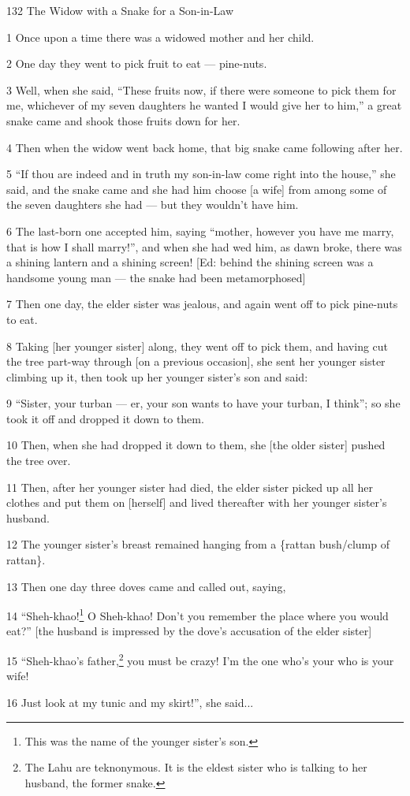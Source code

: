 
132 The Widow with a Snake for a Son-in-Law

1 Once upon a time there was a widowed mother and her child.

2 One day they went to pick fruit to eat --- pine-nuts.

3 Well, when she said, ``These fruits now, if there were someone to pick them for
me, whichever of my seven daughters he wanted I would give her to him,'' a great
snake came and shook those fruits down for her.

4 Then when the widow went back home, that big snake came following after her.

5 ``If thou are indeed and in truth my son-in-law come right into the house,''
she said, and the snake came and she had him choose [a wife] from among some of
the seven daughters she had --- but they wouldn't have him.

6 The last-born one accepted him, saying ``mother, however you have me marry, that
is how I shall marry!'', and when she had wed him, as dawn broke, there was a shining
lantern and a shining screen! [Ed: behind the shining screen was a handsome young
man --- the snake had been metamorphosed]

7 Then one day, the elder sister was jealous, and again went off to pick pine-nuts
to eat.

8 Taking [her younger sister] along, they went off to pick them, and having cut
the tree part-way through [on a previous occasion], she sent her younger sister
climbing up it, then took up her younger sister's son and said:

9 ``Sister, your turban --- er, your son wants to have your turban, I think'';
so she took it off and dropped it down to them.

10 Then, when she had dropped it down to them, she [the older sister] pushed the
tree over.

11 Then, after her younger sister had died, the elder sister picked up all her
clothes and put them on [herself] and lived thereafter with her younger sister's
husband.

12 The younger sister's breast remained hanging from a \{rattan bush/clump of rattan\}.

13 Then one day three doves came and called out, saying,

14 ``Sheh-khao!\footnote{This was the name of the younger sister's son.} O Sheh-khao! Don't you remember the place where you would eat?''
[the husband is impressed by the dove's accusation of the elder sister]

15 ``Sheh-khao's father,\footnote{The Lahu are teknonymous. It is the eldest sister who is talking to her husband, the former snake.} you must be crazy! I'm the one who's your who is your
wife!

16 Just look at my tunic and my skirt!'', she said...

